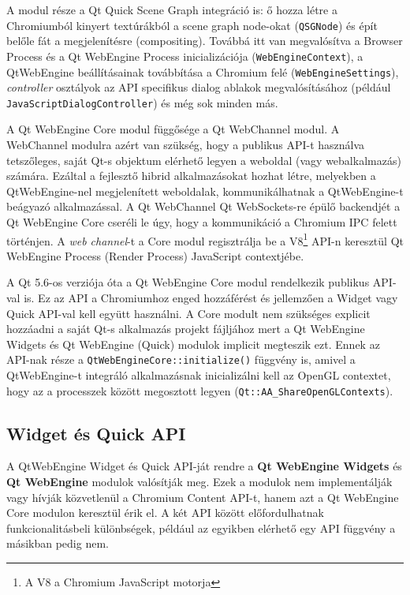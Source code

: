 \documentclass[12pt]{report}
\begin{document}
A modul része a Qt Quick Scene Graph integráció is: ő hozza létre a Chromiumból
kinyert textúrákból a scene graph node-okat (\texttt{QSGNode}) és épít belőle fát a
megjelenítésre (compositing). Továbbá itt van megvalósítva a Browser Process és a Qt WebEngine
Process inicializációja (\texttt{WebEngineContext}), a QtWebEngine beállításainak továbbítása
a Chromium felé (\texttt{WebEngineSettings}), \textit{controller} osztályok az API specifikus
dialog ablakok megvalósításához (például \texttt{JavaScriptDialogController}) és még sok minden
más.

A Qt WebEngine Core modul függősége a Qt WebChannel modul. A WebChannel modulra azért van
szükség, hogy a publikus API-t használva tetszőleges, saját Qt-s objektum elérhető legyen a
weboldal (vagy webalkalmazás) számára. Ezáltal a fejlesztő hibrid alkalmazásokat hozhat létre,
melyekben a QtWebEngine-nel megjelenített weboldalak, kommunikálhatnak a QtWebEngine-t
beágyazó alkalmazással. A Qt WebChannel Qt WebSockets-re épülő backendjét a Qt WebEngine Core
cseréli le úgy, hogy a kommunikáció a Chromium IPC felett történjen. A \textit{web channel}-t
a Core modul regisztrálja be a V8\footnote{A V8 a Chromium JavaScript motorja} API-n keresztül
Qt WebEngine Process (Render Process) JavaScript contextjébe.

A Qt 5.6-os verziója óta a Qt WebEngine Core modul rendelkezik publikus API-val is.
Ez az API a Chromiumhoz enged hozzáférést és jellemzően a Widget vagy Quick API-val kell
együtt használni. A Core modult nem szükséges explicit hozzáadni a saját Qt-s alkalmazás
projekt fájljához mert a Qt WebEngine Widgets és Qt WebEngine (Quick) modulok implicit
megteszik ezt. Ennek az API-nak része a \texttt{QtWebEngineCore::initialize()} függvény is,
amivel a QtWebEngine-t integráló alkalmazásnak inicializálni kell az OpenGL contextet, hogy
az a processzek között megosztott legyen (\texttt{Qt::AA\_ShareOpenGLContexts}).

\subsection{Widget és Quick API}
A QtWebEngine Widget és Quick API-ját rendre a \textbf{Qt WebEngine Widgets} és
\textbf{Qt WebEngine} modulok valósítják meg. Ezek a modulok nem implementálják vagy hívják
közvetlenül a Chromium Content API-t, hanem azt a Qt WebEngine Core modulon keresztül érik el.
A két API között előfordulhatnak funkcionalitásbeli különbségek, például az egyikben elérhető
egy API függvény a másikban pedig nem.
\end{document}
